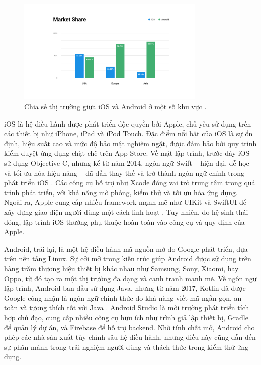 \begin{figure}[H]
  \centering
  \includegraphics[width=0.8\textwidth]{images/Market Share.png}
  \caption{Chia sẻ thị trường giữa iOS và Android ở một số khu vực \cite{egoMarketShare}.}
  \label{fig:fig}
\end{figure}
    
        \hspace*{0.8cm}iOS là hệ điều hành được phát triển độc quyền bởi Apple, chủ yếu sử dụng trên các thiết bị như iPhone, iPad và iPod Touch. Đặc điểm nổi bật của iOS là sự ổn định, hiệu suất cao và mức độ bảo mật nghiêm ngặt, được đảm bảo bởi quy trình kiểm duyệt ứng dụng chặt chẽ trên App Store. Về mặt lập trình, trước đây iOS sử dụng Objective-C, nhưng kể từ năm 2014, ngôn ngữ Swift – hiện đại, dễ học và tối ưu hóa hiệu năng – đã dần thay thế và trở thành ngôn ngữ chính trong phát triển iOS \cite{swift}. Các công cụ hỗ trợ như Xcode đóng vai trò trung tâm trong quá trình phát triển, với khả năng mô phỏng, kiểm thử và tối ưu hóa ứng dụng. Ngoài ra, Apple cung cấp nhiều framework mạnh mẽ như UIKit và SwiftUI để xây dựng giao diện người dùng một cách linh hoạt \cite{swiftui}. Tuy nhiên, do hệ sinh thái đóng, lập trình iOS thường phụ thuộc hoàn toàn vào công cụ và quy định của Apple.
    
        \vspace{0.5em}
    
      \hspace*{0.8cm}Android, trái lại, là một hệ điều hành mã nguồn mở do Google phát triển, dựa trên nền tảng Linux. Sự cởi mở trong kiến trúc giúp Android được sử dụng trên hàng trăm thương hiệu thiết bị khác nhau như Samsung, Sony, Xiaomi, hay Oppo, từ đó tạo ra một thị trường đa dạng và cạnh tranh mạnh mẽ. Về ngôn ngữ lập trình, Android ban đầu sử dụng Java, nhưng từ năm 2017, Kotlin đã được Google công nhận là ngôn ngữ chính thức do khả năng viết mã ngắn gọn, an toàn và tương thích tốt với Java \cite{kotlin}. Android Studio là môi trường phát triển tích hợp chủ đạo, cung cấp nhiều công cụ hữu ích như trình giả lập thiết bị, Gradle để quản lý dự án, và Firebase để hỗ trợ backend. Nhờ tính chất mở, Android cho phép các nhà sản xuất tùy chỉnh sâu hệ điều hành, nhưng điều này cũng dẫn đến sự phân mảnh trong trải nghiệm người dùng và thách thức trong kiểm thử ứng dụng.
    
